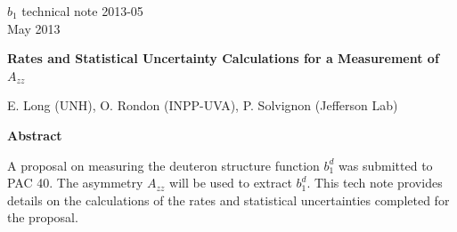 \documentclass[11pt]{article}
\begin{document}
\thispagestyle{empty}
\renewcommand{\thefootnote}{\fnsymbol{footnote}}

\begin{flushright}
{\small
$b_1$ technical note 2013-05\\
May 2013\\}
\end{flushright}

\vspace{.8cm}

\begin{center}
{\bf\large   
Rates and Statistical Uncertainty Calculations for a Measurement of $A_{zz}$}
\vspace{1cm}


E. Long (UNH), O. Rondon (INPP-UVA), P. Solvignon (Jefferson Lab)\\

\end{center}

\vspace{2.0cm}

\begin{center}
{\bf\large   
Abstract }

A proposal on measuring the deuteron structure function $b_1^d$ was submitted to PAC 40. The asymmetry $A_{zz}$ will be used to extract $b_1^d$. This tech note provides details on the calculations of the rates and statistical uncertainties completed for the proposal. 
\end{center}
\newpage



\end{document}
